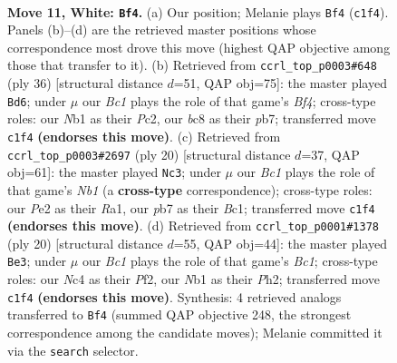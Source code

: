 \documentclass[11pt]{article}
\begin{document}
\clearpage

\begin{figure}[p]\centering
\begin{subfigure}{0.46\textwidth}\centering
\resizebox{\linewidth}{!}{%
\newchessgame
\chessboard[
  setfen={rnb2rk1/pp3pp1/4pn2/2b4p/2N5/6P1/PP2PPBP/RNBR2K1 w - - 0 11},
  showmover=false,
  pgfstyle=straightmove, color=movearrow, markmove={c1-f4}
]}
\caption{}
\end{subfigure}\hfill
\begin{subfigure}{0.46\textwidth}\centering
\resizebox{\linewidth}{!}{%
\newchessgame
\chessboard[
  setfen={r1b2rk1/1p3ppp/2p2n2/2b5/p1N2B2/6P1/PPP2PBP/R3R1K1 w - - 2 19},
  showmover=false,
  pgfstyle=straightmove, color=movearrow, markmove={f4-d6}
]}
\caption{}
\end{subfigure}
\\[4pt]
\begin{subfigure}{0.46\textwidth}\centering
\resizebox{\linewidth}{!}{%
\newchessgame
\chessboard[
  setfen={rnb2rk1/pp3ppp/2p2n2/2b5/8/5NP1/PP2PPBP/RNBR2K1 w - - 4 11},
  showmover=false,
  pgfstyle=straightmove, color=movearrow, markmove={b1-c3}
]}
\caption{}
\end{subfigure}\hfill
\begin{subfigure}{0.46\textwidth}\centering
\resizebox{\linewidth}{!}{%
\newchessgame
\chessboard[
  setfen={rnb2rk1/pp3ppp/4pn2/8/2pN4/P5P1/1P2PPBP/R1B1K2R w KQ - 1 11},
  showmover=false,
  pgfstyle=straightmove, color=movearrow, markmove={c1-e3}
]}
\caption{}
\end{subfigure}
\caption{\textbf{Move 11, White: \texttt{Bf4}.} (a) Our position; Melanie plays \texttt{Bf4} (\texttt{c1f4}). Panels (b)--(d) are the retrieved master positions whose correspondence most drove this move (highest QAP objective among those that transfer to it). (b) Retrieved from \texttt{ccrl\_top\_p0003\#648} (ply 36) [structural distance $d$=51, QAP obj=75]: the master played \texttt{Bd6}; under $\mu$ our \emph{Bc1} plays the role of that game's \emph{Bf4}; cross-type roles: our \emph{N}b1 as their \emph{P}c2, our \emph{b}c8 as their \emph{p}b7; transferred move \texttt{c1f4} \textbf{(endorses this move)}. (c) Retrieved from \texttt{ccrl\_top\_p0003\#2697} (ply 20) [structural distance $d$=37, QAP obj=61]: the master played \texttt{Nc3}; under $\mu$ our \emph{Bc1} plays the role of that game's \emph{Nb1} (a \textbf{cross-type} correspondence); cross-type roles: our \emph{P}e2 as their \emph{R}a1, our \emph{p}b7 as their \emph{B}c1; transferred move \texttt{c1f4} \textbf{(endorses this move)}. (d) Retrieved from \texttt{ccrl\_top\_p0001\#1378} (ply 20) [structural distance $d$=55, QAP obj=44]: the master played \texttt{Be3}; under $\mu$ our \emph{Bc1} plays the role of that game's \emph{Bc1}; cross-type roles: our \emph{N}c4 as their \emph{P}f2, our \emph{N}b1 as their \emph{P}h2; transferred move \texttt{c1f4} \textbf{(endorses this move)}. Synthesis: 4 retrieved analogs transferred to \texttt{Bf4} (summed QAP objective 248, the strongest correspondence among the candidate moves); Melanie committed it via the \texttt{search} selector.}
\label{fig:thought-m20}
\end{figure}
\end{document}
